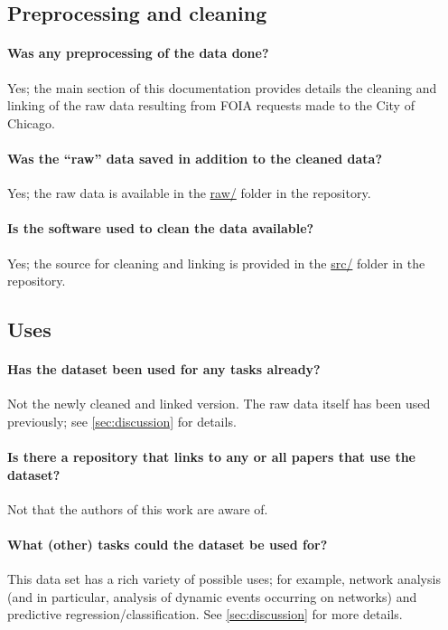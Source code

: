 \subsection{Preprocessing and cleaning}

\paragraph{Was any preprocessing of the data done?}
Yes; the main section of this documentation provides details the cleaning and linking of the raw
data resulting from FOIA requests made to the City of Chicago.

\paragraph{Was the ``raw'' data saved in addition to the cleaned data?}
Yes; the raw data is available in the \url{raw/} folder in the repository.

\paragraph{Is the software used to clean the data available?}
Yes; the source for cleaning and linking is provided in the \url{src/} folder in the repository.

\subsection{Uses}

\paragraph{Has the dataset been used for any tasks already?}
Not the newly cleaned and linked version.
The raw data itself has been used previously; see \cref{sec:discussion} for details.

\paragraph{Is there a repository that links to any or all papers that use the dataset?}
Not that the authors of this work are aware of.

\paragraph{What (other) tasks could the dataset be used for?}
This data set has a rich variety of possible uses; for example,
network analysis (and in particular, analysis of dynamic events occurring on networks)
and predictive regression/classification. See \cref{sec:discussion} for more details.

